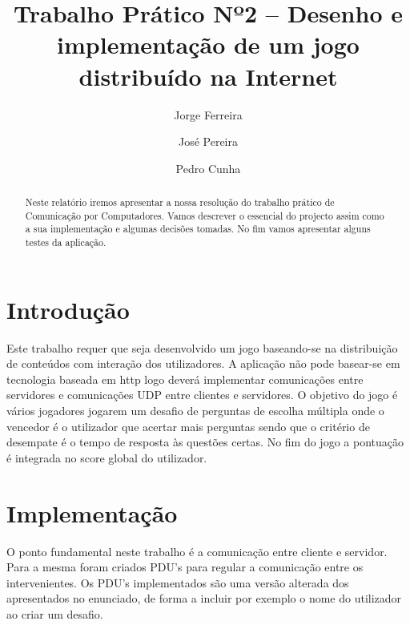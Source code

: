 \documentclass{llncs}
\begin{document}
\title{Trabalho Prático Nº2 – Desenho e implementação de um jogo distribuído na Internet}
\author{Jorge Ferreira \and José Pereira \and  Pedro Cunha}
\maketitle

\begin{abstract}
Neste relatório iremos apresentar a nossa resolução do trabalho prático de Comunicação por Computadores.
Vamos descrever o essencial do projecto assim como a sua implementação e algumas decisões tomadas. No fim vamos apresentar alguns testes da aplicação.
\end{abstract}

\section{Introdução}
Este trabalho requer que seja desenvolvido um jogo baseando-se na distribuição de conteúdos com interação dos utilizadores. A aplicação não pode basear-se em tecnologia baseada em http logo deverá implementar comunicações entre servidores e comunicações UDP entre clientes e servidores. O objetivo do jogo é vários jogadores jogarem um desafio de perguntas de escolha múltipla onde o vencedor é o utilizador que acertar mais perguntas sendo que o critério de desempate é o tempo de resposta às questões certas. No fim do jogo a pontuação é integrada no score global do utilizador.

\section{Implementação}
O ponto fundamental neste trabalho é a comunicação entre cliente e servidor. Para a mesma foram criados PDU's para regular a comunicação entre os intervenientes. Os PDU's implementados são uma versão alterada dos apresentados no enunciado, de forma a incluir por exemplo o nome do utilizador ao criar um desafio.
\end{document}
